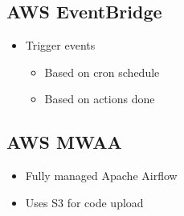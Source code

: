 \documentclass[../../main.tex]{subfiles}
\begin{document}
\subsection{AWS EventBridge}
\begin{itemize}
    \item Trigger events
    \begin{itemize}
        \item Based on cron schedule
        \item Based on actions done
    \end{itemize}
\end{itemize}

\subsection{AWS MWAA}
\begin{itemize}
    \item Fully managed Apache Airflow
    \item Uses S3 for code upload
\end{itemize}
\end{document}
